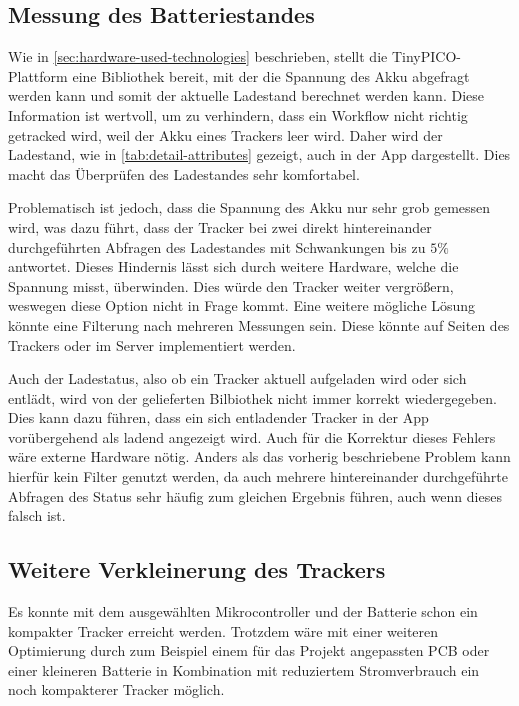 \subsection{Messung des Batteriestandes}

Wie in \autoref{sec:hardware-used-technologies} beschrieben, stellt die TinyPICO-Plattform eine
Bibliothek bereit, mit der die Spannung des \gls{Akku} abgefragt werden kann und somit der aktuelle
Ladestand berechnet werden kann. Diese Information ist wertvoll, um zu verhindern, dass ein Workflow
nicht richtig getracked wird, weil der \gls{Akku} eines Trackers leer wird. Daher wird der
Ladestand, wie in \autoref{tab:detail-attributes} gezeigt, auch in der App dargestellt. Dies macht das
Überprüfen des Ladestandes sehr komfortabel.

Problematisch ist jedoch, dass die Spannung des \gls{Akku} nur sehr grob gemessen wird, was dazu
führt, dass der Tracker bei zwei direkt hintereinander durchgeführten Abfragen des Ladestandes mit
Schwankungen bis zu $5\%$ antwortet. Dieses Hindernis lässt sich durch weitere Hardware, welche
die Spannung misst, überwinden. Dies würde den Tracker weiter vergrößern, weswegen diese Option
nicht in Frage kommt. Eine weitere mögliche Lösung könnte eine Filterung nach mehreren Messungen
sein. Diese könnte auf Seiten des Trackers oder im Server implementiert werden.

Auch der Ladestatus, also ob ein Tracker aktuell aufgeladen wird oder sich entlädt, wird von der
gelieferten Bilbiothek nicht immer korrekt wiedergegeben. Dies kann dazu führen, dass ein sich
entladender Tracker in der App vorübergehend als ladend angezeigt wird. Auch für die Korrektur dieses
Fehlers wäre externe Hardware nötig. Anders als das vorherig beschriebene Problem kann hierfür kein
Filter genutzt werden, da auch mehrere hintereinander durchgeführte Abfragen des Status sehr häufig zum
gleichen Ergebnis führen, auch wenn dieses falsch ist.

\subsection{Weitere Verkleinerung des Trackers}

Es konnte mit dem ausgewählten Mikrocontroller und der Batterie schon ein kompakter Tracker erreicht werden.
Trotzdem wäre mit einer weiteren Optimierung durch zum Beispiel einem für das Projekt angepassten \gls{PCB}
oder einer kleineren Batterie in Kombination mit reduziertem Stromverbrauch ein noch kompakterer Tracker möglich.
